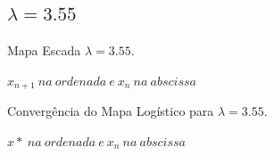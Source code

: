 \documentclass[pdftex,12pt,a4paper]{article}
\begin{document}
\begin{figure}
\subsection{$\lambda = 3.55$}
\centering
\caption{Mapa Escada $\lambda = 3.55$.}
\caption*{$x_{n+1}\ na\ ordenada\ e\ x_{n}\ na\ abscissa$ }
\end{figure}

\begin{figure}
\centering
\caption{Convergência do Mapa Logístico para $\lambda = 3.55$.}
\caption*{$x*\ na\ ordenada\ e\ x_{n}\ na\ abscissa$ }
\end{figure}
\end{document}
